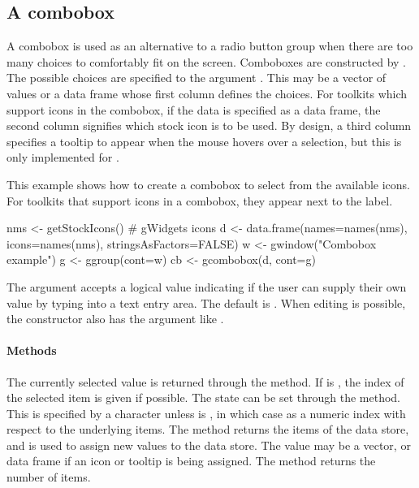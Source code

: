 \subsection{A combobox}
\label{sec:gWidgets-combobox}

A combobox is used as an alternative to a radio button group when
there are too many choices to comfortably fit on the screen. Comboboxes are
constructed by . The possible choices are specified to the argument
. This may be a vector of values or a data
frame whose first column defines the choices. For toolkits which
support icons in the combobox, if the data is specified as a data
frame, the second column signifies which stock icon is to
be used. By design, a third column specifies a tooltip to appear when
the mouse hovers over a selection,
but this is only implemented for .


This example shows how to create a combobox to select from the
available icons. For toolkits that support icons in a combobox, they
appear next to the label.
\begin{Schunk}
\begin{Sinput}
 nms <- getStockIcons()                  # gWidgets icons
 d <- data.frame(names=names(nms), icons=names(nms), 
                 stringsAsFactors=FALSE)
 w <- gwindow("Combobox example")
 g <- ggroup(cont=w)
 cb <- gcombobox(d, cont=g)
\end{Sinput}
\end{Schunk}


The argument  accepts a logical value
indicating if the user can supply their own value by typing into a
text entry area. The default is . When editing is
possible, the constructor also has the
 argument like .

\paragraph{Methods}
The currently selected value is returned through the
 method. If  is , the
index of the selected item is given if possible. The state can be set
through the  method. This is
specified by a character unless  is , in which
case as a numeric index with respect to the underlying items. The
\method{[}{gcombobox} method returns the items of the data store, and
\method{[\ASSIGN}{gcombobox} is used to assign new values to the data
store. The value may be a vector, or data frame if an icon or tooltip
is being assigned. The  method returns the
number of items.

